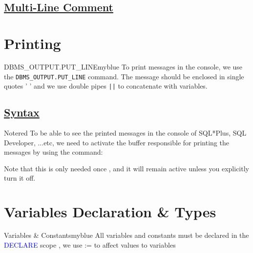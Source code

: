 \subsection*{\underline{Multi-Line Comment}}



\vspace{0.5cm}


\section{Printing}

\begin{prettyBox}{DBMS\_OUTPUT.PUT\_LINE}{myblue}
To print messages in the console, we use the \texttt{DBMS\_OUTPUT.PUT\_LINE} command. The message should be enclosed
in single quotes ' ' and we use double pipes \texttt{||} to concatenate with variables.
\end{prettyBox}

\subsection*{\underline{Syntax}}




\vspace{0.25cm}

\begin{prettyBox}{Note}{red}
To be able to see the printed messages in the console of SQL*Plus, SQL Developer, ...etc, we need to activate
the buffer responsible for printing the messages by using the command: 



Note that this is only needed once , and it will remain active unless you explicitly turn it off.
\end{prettyBox}

\vspace{0.5cm}

\section{Variables Declaration \& Types}

\begin{prettyBox}{Variables \& Constants}{myblue}
All variables and constants must be declared in the \textcolor{blue}{DECLARE} scope , 
we use := to affect values to variables 
\end{prettyBox}

